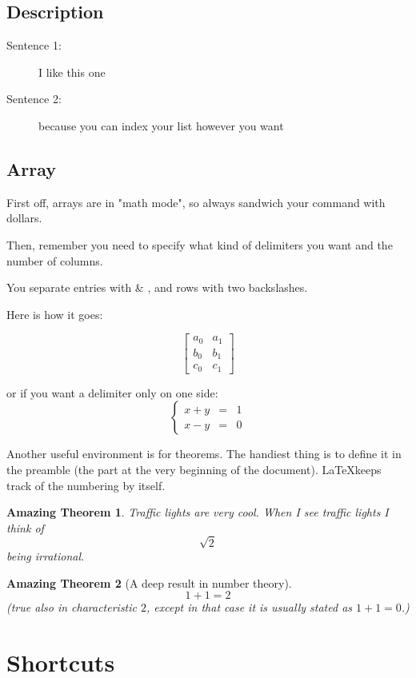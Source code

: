 \documentclass[12pts]{article}
\newcommand{\La}{\LaTeX}
\newtheorem{thm}{Amazing Theorem}
\begin{document}
\subsection{Description}

\begin{description}
	\item[Sentence 1:] I like this one
	\item[Sentence 2:] because you can index your list however you want
\end{description}

\subsection{Array}

First off, arrays are in "math mode", so always sandwich your command with dollars.

Then, remember you need to specify what kind of delimiters you want and the number of columns.

You separate entries with \& , and rows with two backslashes.

Here is how it goes:

$$
\left[
\begin{array}{cc}
a_0 & a_1\\
b_0 & b_1\\
c_0 & c_1
\end{array}
\right]
$$

or if you want a delimiter only on one side:
$$
\left\{
\begin{array}{ccc}
x+y & = & 1\\
x-y  & = & 0
\end{array}
\right.
$$

Another useful environment is for theorems. The handiest thing is to define it in the preamble (the part at the very beginning of the document). \La keeps track of the numbering by itself.

\begin{thm} 
Traffic lights are very cool. When I see traffic lights I think of
$$
\sqrt{2}
$$
being irrational.
\end{thm}


\begin{thm}[A deep result in number theory]
$$
1+1=2
$$
(true also in characteristic $2$, except in that case it is usually stated as $1+1=0$.)
\label{deep}
\end{thm}
\section{Shortcuts}
\end{document}

